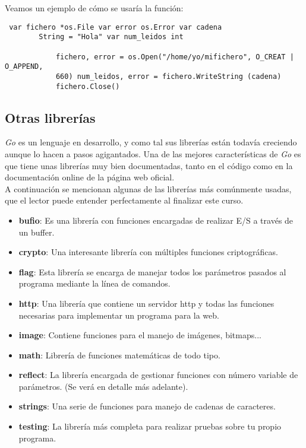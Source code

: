 		Veamos un ejemplo de cómo se usaría la función:
		
		\begin{verbatim} var fichero *os.File var error os.Error var cadena
		String = "Hola" var num_leidos int
		    
			fichero, error = os.Open("/home/yo/mifichero", O_CREAT | O_APPEND,
			660) num_leidos, error = fichero.WriteString (cadena)
			fichero.Close() \end{verbatim}
		
	\subsection{Otras librerías}
	
	\textit{Go} es un lenguaje en desarrollo, y como tal sus librerías están
	todavía creciendo aunque lo hacen a pasos agigantados. Una de las mejores
	características de \textit{Go} es que tiene unas librerías muy bien
	documentadas, tanto en el código como en la documentación online de la
	página web oficial.\\
	
	A continuación se mencionan algunas de las librerías más comúnmente usadas,
	que el lector puede entender perfectamente al finalizar este curso.
	
	\begin{itemize} \item \textbf{bufio}: Es una librería con funciones
	encargadas de realizar E/S a través de un buffer.  \item \textbf{crypto}:
	Una interesante librería con múltiples funciones criptográficas.  \item
	\textbf{flag}: Esta librería se encarga de manejar todos los parámetros
	pasados al programa mediante la línea de comandos.  \item \textbf{http}: Una
	librería que contiene un servidor http y todas las funciones necesarias para
	implementar un programa para la web.  \item \textbf{image}: Contiene
	funciones para el manejo de imágenes, bitmaps...  \item \textbf{math}:
	Librería de funciones matemáticas de todo tipo.  \item \textbf{reflect}: La
	librería encargada de gestionar funciones con número variable de parámetros.
	(Se verá en detalle más adelante).  \item \textbf{strings}: Una serie de
	funciones para manejo de cadenas de caracteres.  \item \textbf{testing}: La
	librería más completa para realizar pruebas sobre tu propio programa.
	\end{itemize}
